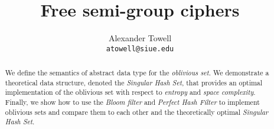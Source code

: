\documentclass[final,11pt,hidelinks]{article}
\title
{
    Free semi-group ciphers
}
\author
{
    Alexander Towell\\
    \texttt{atowell@siue.edu}
}
\date{}
\begin{document}
\maketitle
\begin{abstract}
We define the semantics of abstract data type for the \emph{oblivious set}. We demonstrate a theoretical data structure, denoted the \emph{Singular Hash Set}, that provides an optimal implementation of the oblivious set with respect to \emph{entropy} and \emph{space complexity}. Finally, we show how to use the \emph{Bloom filter} and \emph{Perfect Hash Filter} to implement oblivious sets and compare them to each other and the theoretically optimal \emph{Singular Hash Set}.
\end{abstract}


\tableofcontents
{}



%








%
\printglossary

\end{document}
